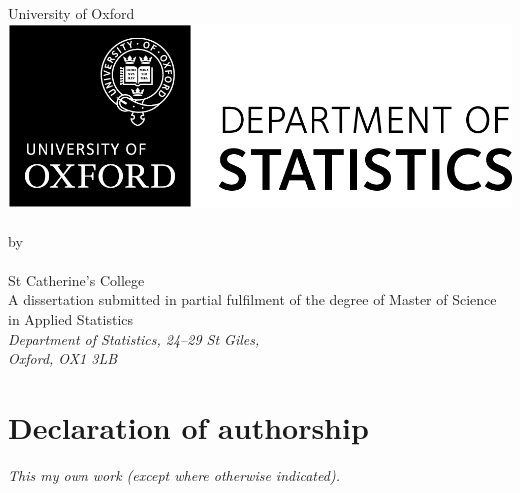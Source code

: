 \documentclass[a4paper,11pt,openany,extrafontsizes]{memoir}
\begin{document}
\pagestyle{plain}
\tightlists%

\begin{titlingpage}
  \begin{center}
    \vspace{1cm}
    \textsf{\Huge{University of Oxford}}\\
    \vspace{1cm}
    \includegraphics[scale=.8]{Stats_Logo.png}\\
    \vspace{2cm}
    \Huge{\thetitle}\\
    \vspace{2cm}
    \large{by\\[14pt]\theauthor\\[8pt]St Catherine's College}\\
    \vfill
    \large{A dissertation submitted in partial fulfilment of the degree of Master of Science in Applied Statistics}\\
    \vspace{.5cm}
    \large{\emph{Department of Statistics, 24--29 St Giles,\\Oxford, OX1 3LB}}\\
    \vspace{1cm}
    \large{\thedate}
  \end{center}
\end{titlingpage}


\frontmatter

\cleardoublepage%

\chapter*{Declaration of authorship}

\emph{This my own work (except where otherwise indicated).}\\[2cm]
\end{document}
